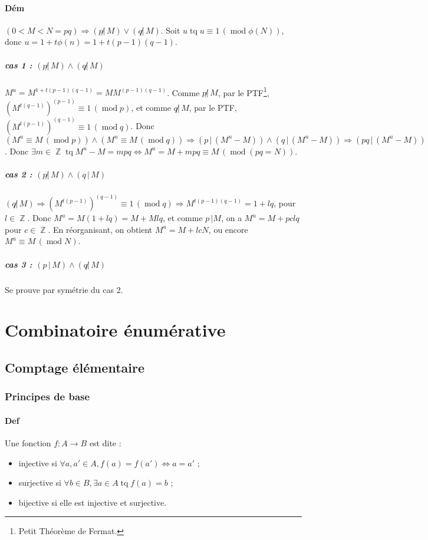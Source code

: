 \documentclass{article}
\DeclareMathOperator{\tq}{\text{ tq }}
\DeclareMathOperator{\Z}{\mathbb Z}
\DeclareMathOperator{\modulo}{mod}
\newcommand{\cmod}[1]{\, (\modulo #1)}
\begin{document}
			\paragraph{Dém} $(0 < M < N = pq) \Rightarrow (p \not | \, M) \lor (q \not | \, M)$. Soit $u \tq u \equiv 1 \cmod{\phi(N)}$, donc
			$u = 1 + t\phi(n) = 1 + t(p-1)(q-1)$.

				\subparagraph{cas 1 : $(p \not | \, M) \land (q \not | \, M)$} $M^u = M^{1 + t(p-1)(q-1)} = MM^{(p-1)(q-1)}$.
				Comme $p \not | \, M$, par le PTF\footnote{Petit Théorème de Fermat.}, $(M^{t(q-1)})^{(p-1)} \equiv 1 \cmod p$, et comme $q \not | \, M$, par le PTF,
				$(M^{t(p-1)})^{(q-1)} \equiv 1 \cmod q$.
				Donc $(M^u \equiv M \cmod p) \land (M^u \equiv M \cmod q) \Rightarrow (p \, | \, (M^u - M)) \land (q \, | \, (M^u - M)) \Rightarrow (pq \, | \, (M^u - M))$.
				Donc $\exists m \in \Z \tq M^u - M = mpq \iff M^u = M + mpq \equiv M \cmod{(pq=N)}$.

				\subparagraph{cas 2 : $(p \not | \, M) \land (q \, | \, M)$} $(q \not | \, M) \Rightarrow (M^{t(p-1)})^{(q-1)} \equiv 1 \cmod q \Rightarrow
				M^{t(p-1)(q-1)} = 1 + lq$, pour $l \in \Z$. Donc $M^u = M(1 + lq) = M + Mlq$, et comme $p \, | M$, on a $M^u = M + pclq$ pour $c \in \Z$. En réorganisant,
				on obtient $M^u = M + lcN$, ou encore $M^u \equiv M \cmod N$.

				\subparagraph{cas 3 : $(p \, | \, M) \land (q \not | \, M)$} Se prouve par symétrie du cas 2.

	\section{Combinatoire énumérative}

		\subsection{Comptage élémentaire}

			\subsubsection{Principes de base}

			\paragraph{Def} Une fonction $f : A \to B$ est dite :
			\begin{itemize}
				\item injective si $\forall a, a' \in A, f(a) = f(a') \iff a = a'$ ;
				\item surjective si $\forall b \in B, \exists a \in A \tq f(a) = b$ ;
				\item bijective si elle est injective et surjective.
			\end{itemize}
\end{document}
